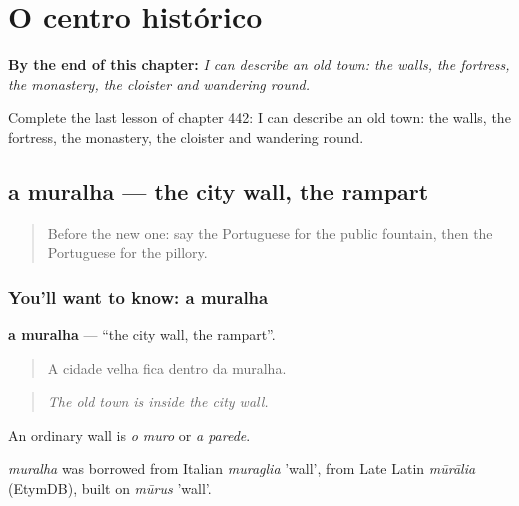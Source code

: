 
\chapter{O centro histórico}
\label{ch:pt-o-centro-historico}

\begin{chapteropening}
\textbf{By the end of this chapter:} \emph{I can describe an old town: the walls, the fortress, the monastery, the cloister and wandering round.}

Complete the last lesson of chapter 442: I can describe an old town: the walls, the fortress, the monastery, the cloister and wandering round.
\end{chapteropening}

\section[a muralha]{a muralha — the city wall, the rampart}

\label{lesson:PT-C442-muralha}



\begin{quote}
Before the new one: say the Portuguese for the public fountain, then the Portuguese for the pillory.
\end{quote}

\subsection*{You'll want to know: a muralha}
\textbf{a muralha} — \textquotedblleft{}the city wall, the rampart\textquotedblright{}.

\begin{quote}
A cidade velha fica dentro da muralha.
\end{quote}

\begin{quote}
\emph{The old town is inside the city wall.}
\end{quote}

An ordinary wall is \emph{o muro} or \emph{a parede}.

\begin{cousinweb}
\emph{muralha} was borrowed from Italian \emph{muraglia} 'wall', from Late Latin \emph{mūrālia} (EtymDB), built on \emph{mūrus} 'wall'.
\end{cousinweb}

